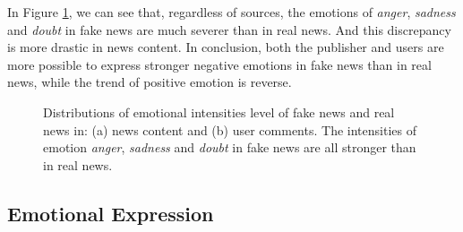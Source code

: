\documentclass[conference]{IEEEtran}
\newcommand{\kai}[1]{\textcolor{blue}{Kai: {#1}}}
\begin{document}
	In Figure \ref{Fig:emotionalIntensity}, we can see that, regardless of sources, the emotions of \textit{anger}, \textit{sadness} and \textit{doubt} in fake news are much  severer than in real news. And this discrepancy is more drastic in news content. In conclusion, both the publisher and users are more possible to express stronger negative emotions in fake news than in real news, while the trend of positive emotion is reverse.
	\begin{figure}[h]
		\centering
		
		\begin{minipage}[t]{0.24\textwidth}
		\end{minipage}
		\begin{minipage}[t]{0.24\textwidth}
		\end{minipage}
		
		\caption{Distributions of emotional intensities level of fake news and real news in: (a) news content and (b) user comments. The intensities of emotion \textit{anger}, \textit{sadness} and \textit{doubt} in fake news are all stronger than in real news.}
		\label{Fig:emotionalIntensity}
	\end{figure}
	
	\subsection{Emotional Expression}
	
\end{document}
